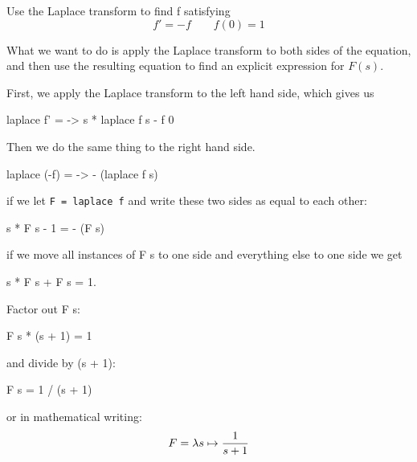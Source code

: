 \iffalse
One of the most important properties of the Laplace transform is that
\begin{equation*}
    \Lplc \left\{ f'(t)\right\} (s) = s F(s) - f(0).
\end{equation*}
This allows us to transform a differential equation into an algebraic equation, i.e. one that only includes the typical operations of algebra.

\fi 

\begin{example}
Use the Laplace transform to find f satisfying 
\begin{equation*}
    f' = - f \qquad f(0) = 1
\end{equation*} 

\end{example}
\begin{solution}
What we want to do is apply the Laplace transform to both sides of the equation, and then use the resulting equation to find an explicit expression for $F(s)$. 

First, we apply the Laplace transform to the left hand side, which gives us 
\begin{codeeq} 
laplace f' = \s -> s * laplace f s - f 0 
\end{codeeq}

Then we do the same thing to the right hand side. 
\begin{codeeq}
laplace (-f) = \s -> - (laplace f s) 
\end{codeeq} 

if we let \verb|F = laplace f| and write these two sides as equal to each other: 

\begin{codeeq} 
s * F s - 1 = - (F s)
\end{codeeq} 

if we move all instances of F s to one side and everything else to one side we get

\begin{codeeq}
s * F s + F s = 1.
\end{codeeq}
Factor out F s:

\begin{codeeq}
F s * (s + 1) = 1
\end{codeeq} 
and divide by (s + 1):

\begin{codeeq}
F s = 1 / (s + 1)
\end{codeeq} 
or in mathematical writing: 
\begin{equation*} 
    F = \lambda s \mapsto \frac{1}{s+1}
\end{equation*} 



\end{solution}
